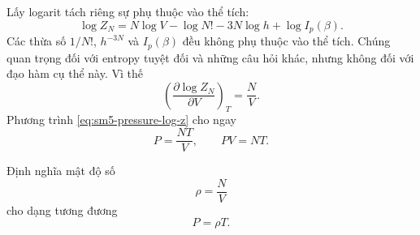 \begin{classroomqa}
\end{classroomqa}

Lấy logarit tách riêng sự phụ thuộc vào thể tích:
\begin{equation}
 \log Z_N
 =
 N\log V-\log N!-3N\log h+\log I_p(\beta).
 \label{eq:sm5-log-ideal-gas-partition}
\end{equation}
Các thừa số \(1/N!\), \(h^{-3N}\) và \(I_p(\beta)\) đều không phụ thuộc vào
thể tích. Chúng quan trọng đối với entropy tuyệt đối và những câu hỏi khác, nhưng không
đối với đạo hàm cụ thể này. Vì thế
\begin{equation}
 \left(\frac{\partial\log Z_N}{\partial V}\right)_T
 =\frac{N}{V}.
 \label{eq:sm5-log-z-volume-derivative}
\end{equation}
Phương trình \eqref{eq:sm5-pressure-log-z} cho ngay
\begin{equation}
 P=\frac{NT}{V},
 \qquad
 \boxed{PV=NT}.
 \label{eq:sm5-ideal-gas-law}
\end{equation}

\begin{classroomqa}
\end{classroomqa}

Định nghĩa mật độ số
\begin{equation}
 \rho=\frac{N}{V}
 \label{eq:sm5-number-density}
\end{equation}
cho dạng tương đương
\begin{equation}
 P=\rho T.
 \label{eq:sm5-density-equation-of-state}
\end{equation}

\begin{classroomqa}
\end{classroomqa}

